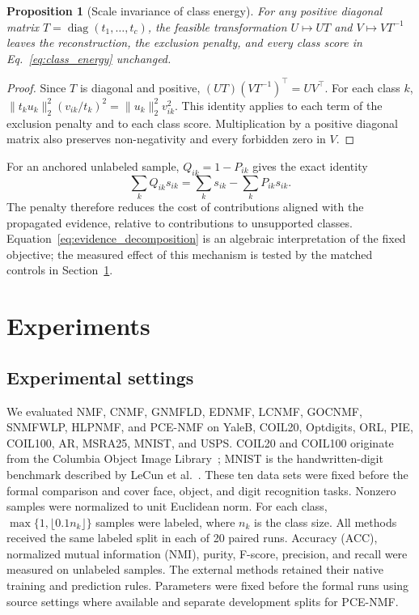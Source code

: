 \documentclass[preprint,12pt]{elsarticle}
\newtheorem{proposition}{Proposition}
\theoremstyle{remark}
\begin{document}
\begin{proposition}[Scale invariance of class energy]
For any positive diagonal matrix
$T=\operatorname{diag}(t_1,\ldots,t_c)$, the feasible transformation
$U\mapsto UT$ and $V\mapsto VT^{-1}$ leaves the reconstruction,
the exclusion penalty, and every class score in
Eq.~\eqref{eq:class_energy} unchanged.
\end{proposition}
\begin{proof}
Since $T$ is diagonal and positive,
$(UT)(VT^{-1})^\top=UV^\top$. For each class $k$,
$\|t_ku_k\|_2^2(v_{ik}/t_k)^2
=\|u_k\|_2^2v_{ik}^2$. This identity applies to each term of
the exclusion penalty and to each class score. Multiplication by a
positive diagonal matrix also preserves non-negativity and every
forbidden zero in $V$.
\end{proof}

For an anchored unlabeled sample, $Q_{ik}=1-P_{ik}$ gives the exact
identity
\begin{equation}
\sum_kQ_{ik}s_{ik}=\sum_ks_{ik}-\sum_kP_{ik}s_{ik}.
\label{eq:evidence_decomposition}
\end{equation}
The penalty therefore reduces the cost of contributions aligned with
the propagated evidence, relative to contributions to unsupported
classes. Equation~\eqref{eq:evidence_decomposition} is an algebraic
interpretation of the fixed objective; the measured effect of this
mechanism is tested by the matched controls in
Section~\ref{sec:experiments}.

\section{Experiments}
\label{sec:experiments}

\subsection{Experimental settings}

We evaluated NMF, CNMF, GNMFLD, EDNMF, LCNMF, GOCNMF, SNMFWLP,
HLPNMF, and PCE-NMF on YaleB, COIL20, Optdigits, ORL, PIE, COIL100,
AR, MSRA25, MNIST, and USPS. COIL20 and COIL100 originate from the
Columbia Object Image Library~\cite{nene1996coil20,nene1996coil}; MNIST is the
handwritten-digit benchmark described by LeCun et al.~\cite{lecun1998gradient}.
These ten data sets were fixed before the formal comparison and cover
face, object, and digit recognition tasks.
Nonzero samples were normalized to unit Euclidean
norm. For each class, $\max\{1,\lfloor 0.1n_k\rfloor\}$ samples were
labeled, where $n_k$ is the class size. All methods received the same
labeled split in each of 20 paired runs. Accuracy
(ACC), normalized mutual information (NMI), purity, F-score, precision,
and recall were measured on unlabeled samples. The external methods
retained their native training and prediction rules. Parameters were
fixed before the formal runs using source settings where available and
separate development splits for PCE-NMF.
\end{document}
